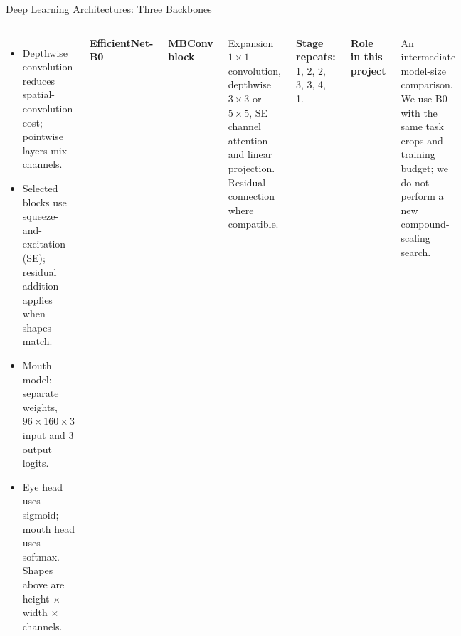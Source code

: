\documentclass[aspectratio=169,10pt]{beamer}
\begin{document}
\begin{frame}[t]{Deep Learning Architectures: Three Backbones}
\begin{columns}[T,onlytextwidth]
\par\vspace{1pt}
\begin{itemize}\setlength\itemsep{0pt}
\item Depthwise convolution reduces spatial-convolution cost; pointwise layers mix channels.
\item Selected blocks use squeeze-and-excitation (SE); residual addition applies when shapes match.
\item Mouth model: separate weights, $96\times160\times3$ input and 3 output logits.
\item Eye head uses sigmoid; mouth head uses softmax. Shapes above are height $\times$ width $\times$ channels.
\end{itemize}
\textbf{EfficientNet-B0}\par\vspace{1pt}
{\centering {}
\par}

\textbf{MBConv block}\par\vspace{1pt}
Expansion $1\times1$ convolution, depthwise $3\times3$ or $5\times5$, SE channel attention and linear projection. Residual connection where compatible.
\par\vspace{1pt}
\textbf{Stage repeats:} 1, 2, 2, 3, 3, 4, 1.
\par\vspace{1pt}
\par\vspace{1pt}\textbf{Role in this project}\par\vspace{1pt}
An intermediate model-size comparison. We use B0 with the same task crops and training budget; we do not perform a new compound-scaling search.


\end{columns}
\end{frame}
\end{document}
